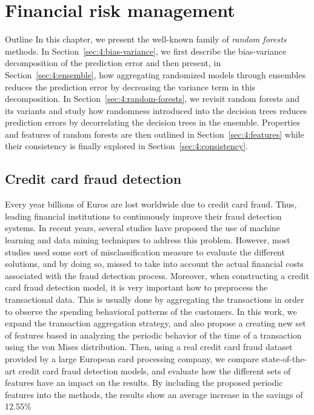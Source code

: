 \chapter{Financial risk management}\label{ch:4}

\begin{remark}{Outline}
In this chapter, we present the well-known family of \textit{random forests}
methods. In Section~\ref{sec:4:bias-variance}, we first describe the bias-variance
decomposition of the prediction error and then present, in
Section~\ref{sec:4:ensemble}, how aggregating randomized models through
ensembles reduces the prediction error by decreasing the variance term in this
decomposition. In Section~\ref{sec:4:random-forests}, we revisit random forests
and its variants and study how randomness introduced into the decision trees
reduces prediction errors by decorrelating the decision
trees in the ensemble. Properties and features of random forests are then outlined
in Section~\ref{sec:4:features} while their consistency
is finally explored in Section~\ref{sec:4:consistency}.
\end{remark}

\section{Credit card fraud detection}

	Every year billions of Euros are lost worldwide due to credit card fraud. Thus, leading financial 
	institutions to continuously improve their fraud detection systems. In recent years, several 
	studies have proposed the use of machine learning and data mining techniques to address this 
	problem. However, most studies used some sort of misclassification measure to evaluate the 
	different solutions, and by doing so, missed to take into account the actual financial costs 
	associated with the fraud detection process. Moreover, when constructing a credit card fraud 
	detection model, it is very important how to 	preprocess the transactional data. This is usually 
	done by aggregating the transactions in order 	to observe the spending behavioral patterns of 
	the customers. In this work, we expand the transaction aggregation strategy, and also propose a 
	creating new set 	of features based in analyzing the periodic behavior of the time of a 
	transaction using the von 	Mises distribution. Then, using a real credit card fraud dataset 
	provided by a large European card processing company, we compare state-of-the-art credit card 
	fraud detection models, and evaluate how the 	different sets of features have an impact on the 
	results. By including the proposed periodic features into the methods, 	the results show an 
	average increase in the savings of 12.55\%
	
